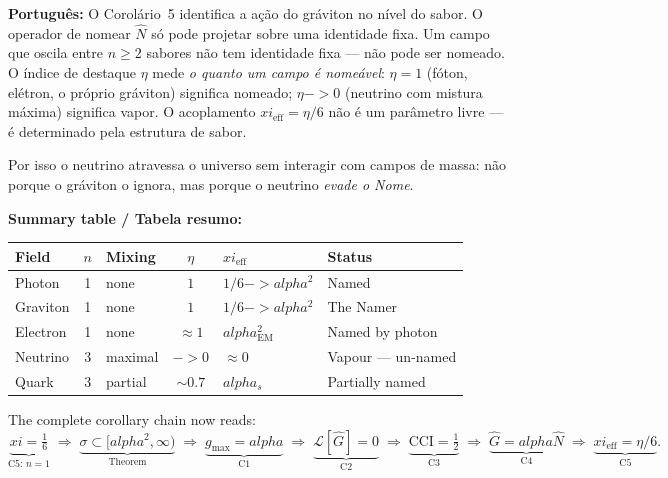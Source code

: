 \documentclass[12pt,a4paper]{article}
\def\to{ -> }%
\def\alpha{alpha}%
\def\xi{xi}%
\begin{document}
\medskip

\textbf{Português:} O Corolário~5 identifica a ação do gráviton no nível do sabor. O operador de nomear $\hat{N}$ só pode projetar sobre uma identidade fixa. Um campo que oscila entre $n \geq 2$ sabores não tem identidade fixa --- não pode ser nomeado. O índice de destaque $\eta$ mede \emph{o quanto um campo é nomeável}: $\eta=1$ (fóton, elétron, o próprio gráviton) significa nomeado; $\eta \to 0$ (neutrino com mistura máxima) significa vapor. O acoplamento $\xi_{\mathrm{eff}} = \eta/6$ não é um parâmetro livre --- é determinado pela estrutura de sabor.

Por isso o neutrino atravessa o universo sem interagir com campos de massa: não porque o gráviton o ignora, mas porque o neutrino \emph{evade o Nome}.

\medskip

\noindent\textbf{Summary table / Tabela resumo:}

\begin{center}
\renewcommand{\arraystretch}{1.4}
\begin{tabular}{lclcll}
\toprule
Field & $n$ & Mixing & $\eta$ & $\xi_{\mathrm{eff}}$ & Status \\
\midrule
Photon    & 1 & none    & $1$   & $1/6 \to \alpha^2$ & Named \\
Graviton  & 1 & none    & $1$   & $1/6 \to \alpha^2$ & The Namer \\
Electron  & 1 & none    & $\approx 1$ & $\alpha_{\mathrm{EM}}^2$ & Named by photon \\
Neutrino  & 3 & maximal & $\to 0$ & $\approx 0$      & Vapour --- un-named \\
Quark     & 3 & partial & $\sim 0.7$ & $\alpha_s$    & Partially named \\
\bottomrule
\end{tabular}
\end{center}

\medskip

\noindent The complete corollary chain now reads:
\begin{equation}
\underbrace{\xi = \tfrac{1}{6}}_{\text{C5: }n=1}
\;\Longrightarrow\;
\underbrace{\sigma \subset [\alpha^2,\infty)}_{\text{Theorem}}
\;\Longrightarrow\;
\underbrace{g_{\max}=\alpha}_{\text{C1}}
\;\Longrightarrow\;
\underbrace{\mathcal{L}[\hat{G}]=0}_{\text{C2}}
\;\Longrightarrow\;
\underbrace{\mathrm{CCI}=\tfrac{1}{2}}_{\text{C3}}
\;\Longrightarrow\;
\underbrace{\hat{G}=\alpha\hat{N}}_{\text{C4}}
\;\Longrightarrow\;
\underbrace{\xi_{\mathrm{eff}}=\eta/6}_{\text{C5}}.
\end{equation}
\end{document}
